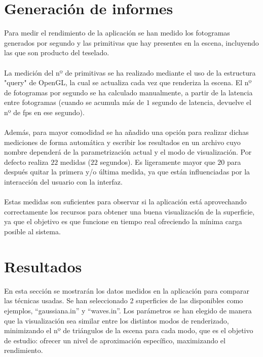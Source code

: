 \section*{Generación de informes}

	Para medir el rendimiento de la aplicación se han medido los fotogramas generados por segundo y las primitivas que hay presentes en la escena, incluyendo las que son producto del teselado.\\
\\La medición del nº de primitivas se ha realizado mediante el uso de la estructura "query" de OpenGL, la cual se actualiza cada vez que renderiza la escena. El nº de fotogramas por segundo se ha calculado manualmente, a partir de la latencia entre fotogramas (cuando se acumula más de $1$ segundo de latencia, devuelve el nº de fps en ese segundo).\\
\\Además, para mayor comodidad se ha añadido una opción para realizar dichas mediciones de forma automática y escribir los resultados en un archivo cuyo nombre dependerá de la parametrización actual y el modo de visualización. Por defecto realiza $22$ medidas ($22$ segundos). Es ligeramente mayor que $20$ para después quitar la primera y/o última medida, ya que están influenciadas por la interacción del usuario con la interfaz.\\
\\Estas medidas son suficientes para observar si la aplicación está aprovechando correctamente los recursos para obtener una buena visualización de la superficie, ya que el objetivo es que funcione en tiempo real ofreciendo la mínima carga posible al sistema.

\section*{Resultados}
	En esta sección se mostrarán los datos medidos en la aplicación para comparar las técnicas usadas. Se han seleccionado 2 superficies de las disponibles como ejemplos, ``gaussiana.in'' y ``waves.in''. Los parámetros se han elegido de manera que la visualización sea similar entre los distintos modos de renderizado, minimizando el nº de triángulos de la escena para cada modo, que es el objetivo de estudio: ofrecer un nivel de aproximación específico, maximizando el rendimiento.
		
